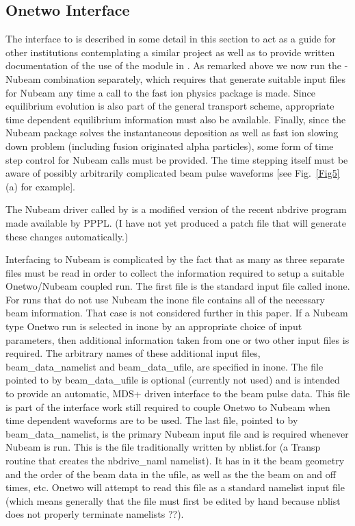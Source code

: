  \subsection{Onetwo Interface}\label{interface}
   The interface to \ot  is described in some detail in this
   section to act as  a guide for other institutions
   contemplating a similar project as well as to provide written
   documentation of the use of the module in \ot. As remarked above we now run the
   \ot-Nubeam combination separately, which requires that \ot
   generate suitable input files for Nubeam any time a call to the
   fast ion physics package is made. Since equilibrium evolution
   is also part of the general transport scheme, appropriate time
   dependent equilibrium information must also be 
   available. Finally, since the Nubeam package solves the
   instantaneous  deposition as
   well as fast ion slowing down problem (including fusion originated
   alpha particles), some form of time step control for Nubeam calls
   must be provided. The time stepping itself must be aware of
   possibly arbitrarily complicated beam pulse waveforms [see
   Fig.~\ref{Fig5}(a) for example].

   The Nubeam driver called by \ot is a modified version of the
   recent nbdrive program  made available by PPPL. (I have not
   yet produced a patch file that will generate these changes automatically.)

   Interfacing to Nubeam is complicated by the fact that as many as
   three separate files must be read in order to collect the
   information required to setup a suitable Onetwo/Nubeam coupled run.
   The first  file is the standard \ot input file called inone. For
   \ot runs that do not use Nubeam the inone file contains all of the
   necessary beam information. That case is not considered further in
   this paper.  If a Nubeam type Onetwo run is selected
   in inone by an appropriate choice of input parameters, then
   additional information taken from one or two other input  files is required.
   The arbitrary names of these additional input files, beam\_data\_namelist and
   beam\_data\_ufile, are specified in inone. The file pointed to by
   beam\_data\_ufile is optional (currently not used)  and is intended to provide an
   automatic, MDS+ driven interface to the beam pulse
   data. This file is  part of the
   interface work still required to couple Onetwo to Nubeam when time
   dependent waveforms are to be used.
 The last file, pointed to
   by beam\_data\_namelist, is the primary Nubeam input file and is
   required whenever Nubeam is run. This is the file traditionally 
   written by nblist.for (a Transp routine  that creates the
   nbdrive\_naml namelist).  It has in it the beam 
   geometry and the order of the beam data in the ufile, as well as
   the the beam on and off times, etc.  Onetwo will attempt to read
   this file as a standard namelist input file (which means generally
   that the file must first be edited by hand because nblist does not
   properly terminate namelists ??).

